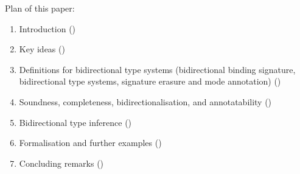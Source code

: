 Plan of this paper:
\begin{enumerate}
  \item Introduction () 
  \item Key ideas ()
  \item Definitions for bidirectional type systems (bidirectional binding signature, bidirectional type systems, signature erasure and mode annotation) ()
  \item Soundness, completeness, bidirectionalisation, and annotatability ()
  \item Bidirectional type inference ()
  \item Formalisation and further examples ()
  \item Concluding remarks ()
     
\end{enumerate}



